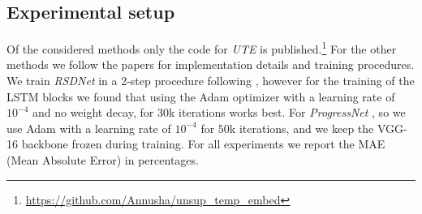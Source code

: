 \subsection{Experimental setup}

Of the considered methods only the code for \textsl{UTE} is published.\footnote{\url{https://github.com/Annusha/unsup_temp_embed}} 
For the other methods we follow the papers for implementation details and training procedures. 
We train \textsl{RSDNet} in a 2-step procedure following , however for the training of the LSTM blocks we found that using the Adam optimizer with a learning rate of $10^{-4}$ and no weight decay, for $30$k iterations works best. 
For \textsl{ProgressNet} , so we use Adam with a learning rate of $10^{-4}$ for $50$k iterations, and we keep the VGG-16 backbone frozen during training. 
For all experiments we report the MAE (Mean Absolute Error) in percentages.



